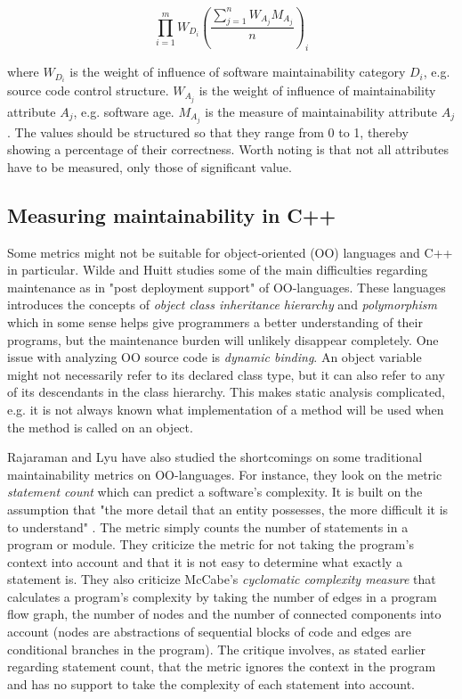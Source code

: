 $$
\prod_{i=1}^m{W_D_i(\frac{\sum_{j=1}^n{W_A_jM_A_j}}{n})_i}
$$

where $W_D_i$ is the weight of influence of software maintainability category
$D_i$, e.g.  source code control structure. $W_A_j$ is the weight of influence
of maintainability attribute $A_j$, e.g. software age. $M_A_j$ is the measure
of maintainability attribute $A_j$. The values should be structured so that
they range from 0 to 1, thereby showing a percentage of their correctness.
Worth noting is that not all attributes have to be measured, only those of
significant value.

\subsection{Measuring maintainability in C++}

Some metrics might not be suitable for object-oriented (OO) languages and C++
in particular. Wilde and Huitt \cite{wilde1991maintenance} studies some of the
main difficulties regarding maintenance as in "post deployment support" of
OO-languages. These languages introduces the concepts of \textit{object class
inheritance hierarchy} and \textit{polymorphism} which in some sense helps give
programmers a better understanding of their programs, but the maintenance
burden will unlikely disappear completely. One issue with analyzing OO source
code is \textit{dynamic binding}. An object variable might not necessarily
refer to its declared class type, but it can also refer to any of its
descendants in the class hierarchy. This makes static analysis complicated,
e.g. it is not always known what implementation of a method will be used when
the method is called on an object.

Rajaraman and Lyu \cite{rajaraman1992reliability} have also studied the
shortcomings on some traditional maintainability metrics on OO-languages. For
instance, they look on the metric \textit{statement count} which can predict a
software's complexity. It is built on the assumption that "the more detail that
an entity possesses, the more difficult it is to understand"
\cite{rajaraman1992reliability}. The metric simply counts the number of
statements in a program or module. They criticize the metric for not taking the
program's context into account and that it is not easy to determine what
exactly a statement is. They also criticize McCabe's
\cite{mccabe1976complexity} \textit{cyclomatic complexity measure} that
calculates a program's complexity by taking the number of edges in a program
flow graph, the number of nodes and the number of connected components into
account (nodes are abstractions of sequential blocks of code and edges are
conditional branches in the program). The critique involves, as stated earlier
regarding statement count, that the metric ignores the context in the program
and has no support to take the complexity of each statement into account.

